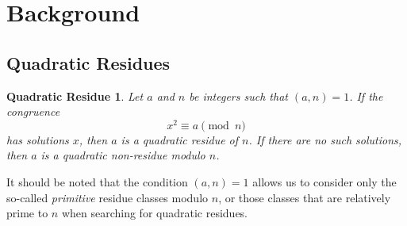 \documentclass{article}
\theoremstyle{plain}
\begin{document}
\newpage




\section {Background}



\subsection{Quadratic Residues}
\newtheorem*{quadraticresiduedefinition}{Quadratic Residue}
\begin{quadraticresiduedefinition}
Let $a$ and $n$ be integers such that $(a,n) = 1$. If the congruence
	$$x^2 \equiv a \pmod n$$
has solutions $x$, then $a$ is a \textit{quadratic residue} of $n$. If there are no such solutions, then $a$ is a \textit{quadratic non-residue} modulo $n$.
\end{quadraticresiduedefinition}

\par It should be noted that the condition $(a,n) = 1$ allows us to consider only the so-called \textit{primitive} residue classes modulo $n$, or those classes that are relatively prime to $n$ when searching for quadratic residues. 
\end{document}
